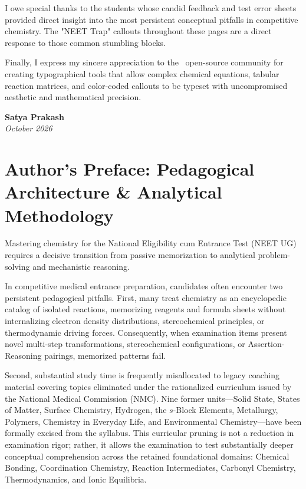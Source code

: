 \documentclass[10pt,twoside,openright]{book}
\begin{document}
I owe special thanks to the students whose candid feedback and test error sheets provided direct insight into the most persistent conceptual pitfalls in competitive chemistry. The "NEET Trap" callouts throughout these pages are a direct response to those common stumbling blocks.

Finally, I express my sincere appreciation to the \LaTeXe\ open-source community for creating typographical tools that allow complex chemical equations, tabular reaction matrices, and color-coded callouts to be typeset with uncompromised aesthetic and mathematical precision.

\vspace{1cm}
\begin{flushright}
  \textbf{Satya Prakash}\\
  \textit{October 2026}
\end{flushright}
\cleardoublepage

\chapter*{Author's Preface: Pedagogical Architecture \& Analytical Methodology}

Mastering chemistry for the National Eligibility cum Entrance Test (NEET UG) requires a decisive transition from passive memorization to analytical problem-solving and mechanistic reasoning.

In competitive medical entrance preparation, candidates often encounter two persistent pedagogical pitfalls. First, many treat chemistry as an encyclopedic catalog of isolated reactions, memorizing reagents and formula sheets without internalizing electron density distributions, stereochemical principles, or thermodynamic driving forces. Consequently, when examination items present novel multi-step transformations, stereochemical configurations, or Assertion-Reasoning pairings, memorized patterns fail.

Second, substantial study time is frequently misallocated to legacy coaching material covering topics eliminated under the rationalized curriculum issued by the National Medical Commission (NMC). Nine former units—Solid State, States of Matter, Surface Chemistry, Hydrogen, the $s$-Block Elements, Metallurgy, Polymers, Chemistry in Everyday Life, and Environmental Chemistry—have been formally excised from the syllabus. This curricular pruning is not a reduction in examination rigor; rather, it allows the examination to test substantially deeper conceptual comprehension across the retained foundational domains: Chemical Bonding, Coordination Chemistry, Reaction Intermediates, Carbonyl Chemistry, Thermodynamics, and Ionic Equilibria.
\end{document}

